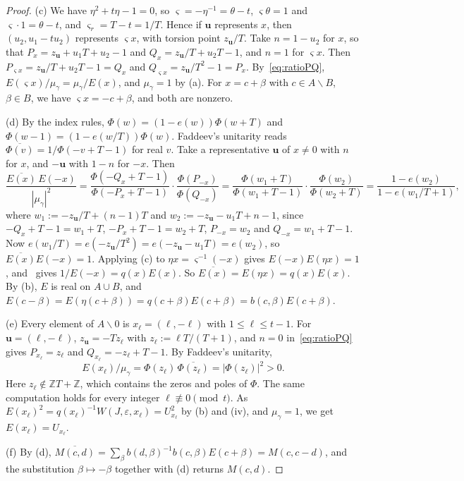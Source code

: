 \documentclass[11pt]{amsart}
\numberwithin{equation}{section}
\theoremstyle{plain}
\theoremstyle{definition}
\theoremstyle{remark}
\begin{document}
\begin{proof}
(c) We have \(\eta^2+t\eta-1=0\), so \(\varsigma=-\eta^{-1}=\theta-t\), \(\varsigma\theta=1\) and \(\varsigma\cdot1=\theta-t\), and \(\varsigma_r=T-t=1/T\). Hence if \(\mathbf u\) represents \(x\), then \((u_2,u_1-tu_2)\) represents \(\varsigma x\), with torsion point \(z_{\mathbf u}/T\). Take \(n=1-u_2\) for \(x\), so that \(P_x=z_{\mathbf u}+u_1T+u_2-1\) and \(Q_x=z_{\mathbf u}/T+u_2T-1\), and \(n=1\) for \(\varsigma x\). Then \(P_{\varsigma x}=z_{\mathbf u}/T+u_2T-1=Q_x\) and \(Q_{\varsigma x}=z_{\mathbf u}/T^2-1=P_x\). By~\eqref{eq:ratioPQ}, \(E(\varsigma x)/\mu_\gamma=\mu_\gamma/E(x)\), and \(\mu_\gamma=1\) by (a). For \(x=c+\beta\) with \(c\in A\smallsetminus B\), \(\beta\in B\), we have \(\varsigma x=-c+\beta\), and both are nonzero.

(d) By the index rules, \(\Phi(w)=(1-e(w))\Phi(w+T)\) and \(\Phi(w-1)=(1-e(w/T))\Phi(w)\). Faddeev's unitarity reads \(\overline{\Phi(v)}=1/\Phi(-v+T-1)\) for real \(v\). Take a representative \(\mathbf u\) of \(x\ne0\) with \(n\) for \(x\), and \(-\mathbf u\) with \(1-n\) for \(-x\). Then
\[\frac{\overline{E(x)}\,E(-x)}{|\mu_\gamma|^2}=\frac{\Phi(-Q_x+T-1)}{\Phi(-P_x+T-1)}\cdot\frac{\Phi(P_{-x})}{\Phi(Q_{-x})}=\frac{\Phi(w_1+T)}{\Phi(w_1+T-1)}\cdot\frac{\Phi(w_2)}{\Phi(w_2+T)}=\frac{1-e(w_2)}{1-e(w_1/T+1)},\]
where \(w_1:=-z_{\mathbf u}/T+(n-1)T\) and \(w_2:=-z_{\mathbf u}-u_1T+n-1\), since \(-Q_x+T-1=w_1+T\), \(-P_x+T-1=w_2+T\), \(P_{-x}=w_2\) and \(Q_{-x}=w_1+T-1\). Now \(e(w_1/T)=e(-z_{\mathbf u}/T^2)=e(-z_{\mathbf u}-u_1T)=e(w_2)\), so \(\overline{E(x)}E(-x)=1\). Applying (c) to \(\eta x=\varsigma^{-1}(-x)\) gives \(E(-x)E(\eta x)=1\), and~\cite[(5)]{RW} gives \(1/E(-x)=q(x)E(x)\). So \(\overline{E(x)}=E(\eta x)=q(x)E(x)\). By (b), \(E\) is real on \(A\cup B\), and \(E(c-\beta)=E(\eta(c+\beta))=q(c+\beta)E(c+\beta)=b(c,\beta)E(c+\beta)\).

(e) Every element of \(A\smallsetminus0\) is \(x_\ell=(\ell,-\ell)\) with \(1\le\ell\le t-1\). For \(\mathbf u=(\ell,-\ell)\), \(z_{\mathbf u}=-Tz_\ell\) with \(z_\ell:=\ell T/(T+1)\), and \(n=0\) in~\eqref{eq:ratioPQ} gives \(P_{x_\ell}=z_\ell\) and \(Q_{x_\ell}=-z_\ell+T-1\). By Faddeev's unitarity,
\[E(x_\ell)/\mu_\gamma=\Phi(z_\ell)\,\overline{\Phi(z_\ell)}=|\Phi(z_\ell)|^2>0.\]
Here \(z_\ell\notin\mathbb ZT+\mathbb Z\), which contains the zeros and poles of \(\Phi\). The same computation holds for every integer \(\ell\not\equiv0\pmod t\). As \(E(x_\ell)^2=q(x_\ell)^{-1}W(J,\varepsilon,x_\ell)=U_{x_\ell}^2\) by (b) and (iv), and \(\mu_\gamma=1\), we get \(E(x_\ell)=U_{x_\ell}\).

(f) By (d), \(\overline{M(c,d)}=\sum_\beta b(d,\beta)^{-1}b(c,\beta)E(c+\beta)=M(c,c-d)\), and the substitution \(\beta\mapsto-\beta\) together with (d) returns \(M(c,d)\).
\end{proof}
\end{document}
